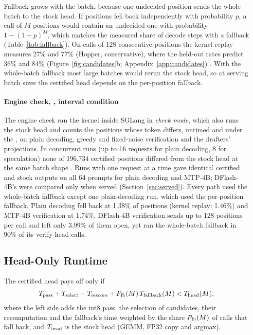 Fallback grows with the batch, because one undecided position sends the whole batch to the stock head. If positions fell back independently with probability $p$, a call of $M$ positions would contain an undecided one with probability $1-(1-p)^M$, which matches the measured share of decode steps with a fallback (Table~\ref{tab:fallback}). On calls of 128 consecutive positions the kernel replay measures 27\% and 77\% (Hopper, conservative), where the held-out rates predict 36\% and 84\% (Figure~\ref{fig:candidates}b; Appendix~\ref{app:candidates}) . With the whole-batch fallback most large batches would rerun the stock head, so at serving batch sizes the certified head depends on the per-position fallback.

\paragraph{Engine check, \Rstock{}, interval condition}\label{sec:engine} The engine check ran the kernel inside SGLang in \emph{check mode}, which also runs the stock head and counts the positions whose token differs, untimed and under the \modelcons, on plain decoding, greedy and fixed-noise verification and the drafters' projections. In concurrent runs (up to 16 requests for plain decoding, 8 for speculation) none of 196,734 certified positions differed from the stock head at the same batch shape . Runs with one request at a time gave identical certified and stock outputs on all 64 prompts for plain decoding and MTP-4B; DFlash-4B's were compared only when served (Section~\ref{sec:served}). Every path used the whole-batch fallback except one plain-decoding run, which used the per-position fallback. Plain decoding fell back at 1.38\% of positions (kernel replay: 1.46\%) and MTP-4B verification at 1.74\%. DFlash-4B verification sends up to 128 positions per call and left only 3.99\% of them open, yet ran the whole-batch fallback in 90\% of its verify head calls.

\subsection{Head-Only Runtime}\label{sec:kernel-runtime}
The certified head pays off only if
\begin{equation}
T_{\rm pass}+T_{\rm select}+T_{\rm rescore}+P_{\rm fb}(M)\,T_{\rm fallback}(M)<T_{\rm head}(M),\label{eq:headgate}
\end{equation}
where the left side adds the int8 pass, the selection of candidates, their recomputation and the fallback's time weighted by the share $P_{\rm fb}(M)$ of calls that fall back, and $T_{\rm head}$ is the stock head (GEMM, FP32 copy and argmax).

